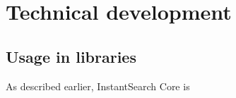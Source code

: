 
\chapter{Technical development} %
\label{chp:execution}








\section{Usage in libraries} %
\label{sec:usage_in_libraries}

As described earlier, InstantSearch Core is 


